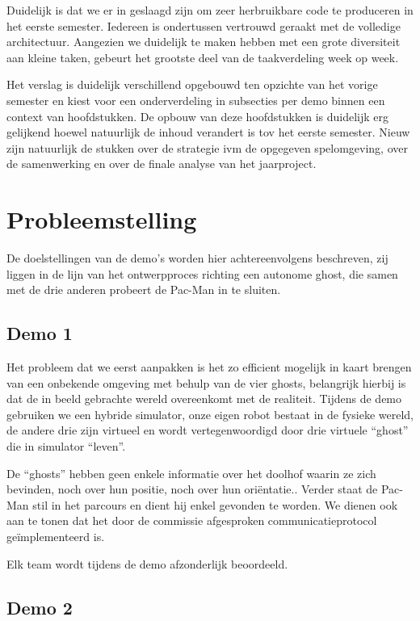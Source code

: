 \documentclass[12pt,a4paper]{report}
\begin{document}
Duidelijk is dat we er in geslaagd zijn om zeer herbruikbare code te produceren in het eerste semester. Iedereen is ondertussen vertrouwd geraakt met de volledige architectuur. Aangezien we duidelijk te maken hebben met een grote diversiteit aan kleine taken, gebeurt het grootste deel van de taakverdeling week op week.

Het verslag is duidelijk verschillend opgebouwd ten opzichte van het vorige semester en kiest voor een onderverdeling in subsecties per demo binnen een context van hoofdstukken. De opbouw van deze hoofdstukken is duidelijk erg gelijkend hoewel natuurlijk de inhoud verandert is tov het eerste semester. Nieuw zijn natuurlijk de stukken over de strategie ivm de opgegeven spelomgeving, over de samenwerking en over de finale analyse van het jaarproject.

\chapter{Probleemstelling}

De doelstellingen van de demo's worden hier achtereenvolgens beschreven, zij liggen in de lijn van het ontwerpproces richting een autonome ghost, die samen met de drie anderen probeert de Pac-Man in te sluiten.

\section{Demo 1}

Het probleem dat we eerst aanpakken is het zo efficient mogelijk in kaart brengen van een onbekende omgeving met behulp van de vier ghosts, belangrijk hierbij is dat de in beeld gebrachte wereld overeenkomt met de realiteit. Tijdens de demo gebruiken we een hybride simulator, onze eigen robot bestaat in de fysieke wereld, de andere drie zijn virtueel en wordt vertegenwoordigd door drie virtuele ``ghost'' die in simulator ``leven''.

De ``ghosts'' hebben geen enkele informatie over het doolhof waarin ze zich bevinden, noch over hun positie, noch over hun ori\"entatie.. Verder staat de Pac-Man stil in het parcours en dient hij enkel gevonden te worden. We dienen ook aan te tonen dat het door de commissie afgesproken communicatieprotocol ge\"implementeerd is.

Elk team wordt tijdens de demo afzonderlijk beoordeeld.
 
\section{Demo 2}
 
\end{document}
